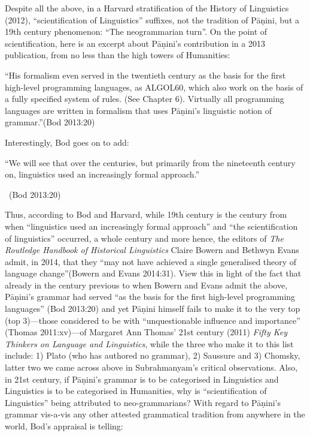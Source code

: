 Despite all the above, in a Harvard stratification of the History of Linguistics (2012), “scientification of Linguistics” suffixes, not the tradition of Pāṇini, but a 19th century phenomenon: “The neogrammarian turn”. On the point of scientification, here is an excerpt about Pāṇini’s contribution in a 2013 publication, from no less than the high towers of Humanities:

\begin{myquote}
“His formalism even served in the twentieth century as the basis for the first high-level programming languages, as ALGOL60, which also work on the basis of a fully specified system of rules. (See Chapter 6). Virtually all programming languages are written in formalism that uses Pāṇini’s linguistic notion of grammar.”\hfill (Bod 2013:20)
\end{myquote}

Interestingly, Bod goes on to add:

\begin{myquote}
“We will see that over the centuries, but primarily from the nineteenth century on, linguistics used an increasingly formal approach.”

~\hfill (Bod 2013:20)
\end{myquote}

Thus, according to Bod and Harvard, while 19th century is the century from when “linguistics used an increasingly formal approach” and “the scientification of linguistics” occurred, a whole century and more hence, the editors of \textit{The Routledge Handbook of Historical Linguistics} Claire Bowern and Bethwyn Evans admit, in 2014, that they “may not have achieved a single generalised theory of language change”(Bowern and Evans 2014:31). View this in light of the fact that already in the century previous to when Bowern and Evans admit the above, Pāṇini’s grammar had served “as the basis for the first high-level programming languages” (Bod 2013:20) and yet Pāṇini himself fails to make it to the very top (top 3)—those considered to be with “unquestionable influence and importance” (Thomas 2011:xv)—of Margaret Ann Thomas’ 21st century (2011) \textit{Fifty Key Thinkers on Language and Linguistics}, while the three who make it to this list include: 1) Plato (who has authored no grammar), 2) Saussure and 3) Chomsky, latter two we came across above in Subrahmanyam’s critical observations. Also, in 21st century, if Pāṇini’s grammar is to be categorised in Linguistics and Linguistics is to be categorised in Humanities, why is “scientification of Linguistics” being attributed to neo-grammarians? With regard to Pāṇini’s grammar vis-a-vis any other attested grammatical tradition from anywhere in the world, Bod’s appraisal is telling:

